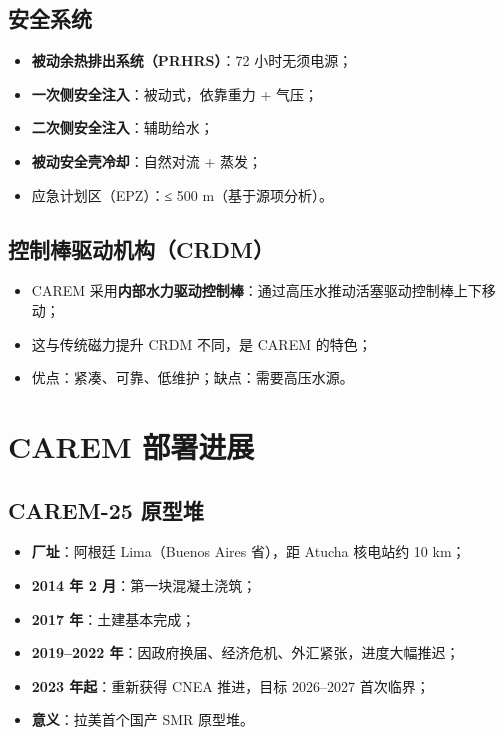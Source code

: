 \documentclass[
  UTF8,
  scheme=plain,
  fontsize=10pt,
  openany
]{ctexbook}
\begin{document}
\subsection{安全系统}\label{ux5b89ux5168ux7cfbux7edf-1}

\begin{itemize}
\tightlist
\item
  \textbf{被动余热排出系统（PRHRS）}：72 小时无须电源；
\item
  \textbf{一次侧安全注入}：被动式，依靠重力 + 气压；
\item
  \textbf{二次侧安全注入}：辅助给水；
\item
  \textbf{被动安全壳冷却}：自然对流 + 蒸发；
\item
  应急计划区（EPZ）：≤ 500 m（基于源项分析）。
\end{itemize}

\subsection{控制棒驱动机构（CRDM）}\label{ux63a7ux5236ux68d2ux9a71ux52a8ux673aux6784crdm-1}

\begin{itemize}
\tightlist
\item
  CAREM
  采用\textbf{内部水力驱动控制棒}：通过高压水推动活塞驱动控制棒上下移动；
\item
  这与传统磁力提升 CRDM 不同，是 CAREM 的特色；
\item
  优点：紧凑、可靠、低维护；缺点：需要高压水源。
\end{itemize}

\section{CAREM 部署进展}\label{carem-ux90e8ux7f72ux8fdbux5c55}

\subsection{CAREM-25 原型堆}\label{carem-25-ux539fux578bux5806}

\begin{itemize}
\tightlist
\item
  \textbf{厂址}：阿根廷 Lima（Buenos Aires 省），距 Atucha 核电站约 10
  km；
\item
  \textbf{2014 年 2 月}：第一块混凝土浇筑；
\item
  \textbf{2017 年}：土建基本完成；
\item
  \textbf{2019--2022 年}：因政府换届、经济危机、外汇紧张，进度大幅推迟；
\item
  \textbf{2023 年起}：重新获得 CNEA 推进，目标 2026--2027 首次临界；
\item
  \textbf{意义}：拉美首个国产 SMR 原型堆。
\end{itemize}
\end{document}
